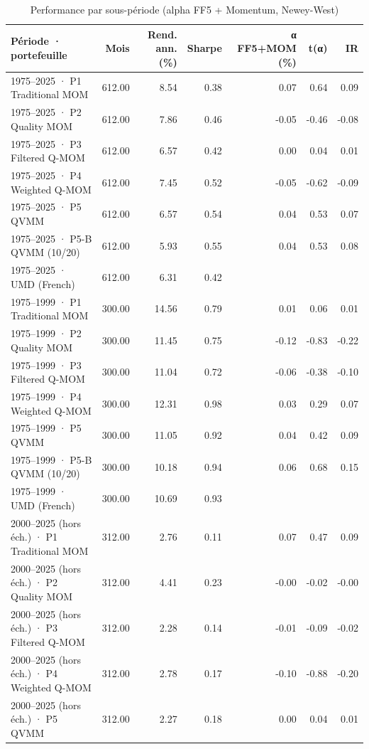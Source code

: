 \begin{table}[htbp]
\centering
\small
\caption{Performance par sous-période (alpha FF5 + Momentum, Newey-West)}
\label{tab:T9_sous_periodes}
\begin{tabular}{lrrrrrr}
\toprule
Période · portefeuille & Mois & Rend. ann. (\%) & Sharpe & α FF5+MOM (\%) & t(α) & IR \\
\midrule
1975–2025 · P1 Traditional MOM & 612.00 & 8.54 & 0.38 & 0.07 & 0.64 & 0.09 \\
1975–2025 · P2 Quality MOM & 612.00 & 7.86 & 0.46 & -0.05 & -0.46 & -0.08 \\
1975–2025 · P3 Filtered Q-MOM & 612.00 & 6.57 & 0.42 & 0.00 & 0.04 & 0.01 \\
1975–2025 · P4 Weighted Q-MOM & 612.00 & 7.45 & 0.52 & -0.05 & -0.62 & -0.09 \\
1975–2025 · P5 QVMM & 612.00 & 6.57 & 0.54 & 0.04 & 0.53 & 0.07 \\
1975–2025 · P5-B QVMM (10/20) & 612.00 & 5.93 & 0.55 & 0.04 & 0.53 & 0.08 \\
1975–2025 · UMD (French) & 612.00 & 6.31 & 0.42 &  &  &  \\
1975–1999 · P1 Traditional MOM & 300.00 & 14.56 & 0.79 & 0.01 & 0.06 & 0.01 \\
1975–1999 · P2 Quality MOM & 300.00 & 11.45 & 0.75 & -0.12 & -0.83 & -0.22 \\
1975–1999 · P3 Filtered Q-MOM & 300.00 & 11.04 & 0.72 & -0.06 & -0.38 & -0.10 \\
1975–1999 · P4 Weighted Q-MOM & 300.00 & 12.31 & 0.98 & 0.03 & 0.29 & 0.07 \\
1975–1999 · P5 QVMM & 300.00 & 11.05 & 0.92 & 0.04 & 0.42 & 0.09 \\
1975–1999 · P5-B QVMM (10/20) & 300.00 & 10.18 & 0.94 & 0.06 & 0.68 & 0.15 \\
1975–1999 · UMD (French) & 300.00 & 10.69 & 0.93 &  &  &  \\
2000–2025 (hors éch.) · P1 Traditional MOM & 312.00 & 2.76 & 0.11 & 0.07 & 0.47 & 0.09 \\
2000–2025 (hors éch.) · P2 Quality MOM & 312.00 & 4.41 & 0.23 & -0.00 & -0.02 & -0.00 \\
2000–2025 (hors éch.) · P3 Filtered Q-MOM & 312.00 & 2.28 & 0.14 & -0.01 & -0.09 & -0.02 \\
2000–2025 (hors éch.) · P4 Weighted Q-MOM & 312.00 & 2.78 & 0.17 & -0.10 & -0.88 & -0.20 \\
2000–2025 (hors éch.) · P5 QVMM & 312.00 & 2.27 & 0.18 & 0.00 & 0.04 & 0.01 \\

\end{tabular}
\end{table}
